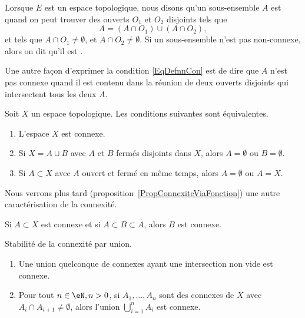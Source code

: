 \begin{definition}  \label{DefIRKNooJJlmiD}
     Lorsque $E$ est un espace topologique, nous disons qu'un sous-ensemble $A$ est  quand on peut trouver des ouverts $O_1$ et $O_2$ disjoints tels que
    \begin{equation}    \label{EqDefnnCon}
        A=(A\cap O_1)\cup (A\cap O_2),
    \end{equation}
    et tels que $A\cap O_1\neq\emptyset$, et $A\cap O_2\neq\emptyset$. Si un sous-ensemble n'est pas non-connexe, alors on dit qu'il est .
\end{definition}
Une autre façon d'exprimer la condition \eqref{EqDefnnCon} est de dire que $A$ n'est pas connexe quand il est contenu dans la réunion de deux ouverts disjoints qui intersectent tous les deux $A$.

\begin{proposition} \label{PropHSjJcIr}
    Soit \( X\) un espace topologique. Les conditions suivantes sont équivalentes.
    \begin{enumerate}
        \item
            L'espace \( X\) est connexe.
        \item
            Si \( X=A\sqcup B\) avec \( A\) et \( B\) fermés disjoints dans \( X\), alors \( A=\emptyset\) ou \( B=\emptyset\).
        \item       \label{ITEMooNIPZooIDPmEf}
            Si \( A\subset X\) avec \( A\) ouvert et fermé en même temps, alors \( A=\emptyset\) ou \( A=X\).
    \end{enumerate}
\end{proposition}

Nous verrons plus tard (proposition~\ref{PropConnexiteViaFonction}) une autre caractérisation de la connexité.

\begin{proposition}
    Si \( A\subset X\) est connexe et si \( A\subset B\subset \bar A\), alors \( B\) est connexe.
\end{proposition}

\begin{proposition} \label{PropIWIDzzH}
    Stabilité de la connexité par union.
    \begin{enumerate}
        \item
    Une union quelconque de connexes ayant une intersection non vide est connexe.
\item
    Pour tout \( n \in \eN, n > 0 \), si \( A_1,\ldots, A_n\) sont des connexes de \( X\) avec \( A_i\cap A_{i+1}\neq \emptyset\), alors l'union \( \bigcup_{i=1}^nA_i\) est connexe.
    \end{enumerate}
\end{proposition}

